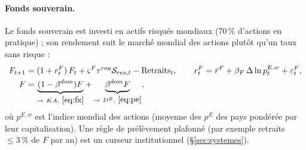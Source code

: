 \documentclass[11pt,a4paper]{article}
\begin{document}
\paragraph{Fonds souverain.} Le fonds souverain est investi en actifs risqués mondiaux (70\,\% d'actions en pratique) ; son rendement suit le marché mondial des actions plutôt qu'un taux sans risque :
\begin{equation}
\begin{split}
F_{t+1} &= (1+r^F_t)\,F_t + \varsigma^F\tau^{roy}\mathcal{S}_{res,t} - \text{Retraits}_t, \qquad
r^F_t = \bar r^F + \beta_F\,\Delta\ln p^{E,w}_t + \varepsilon^F_t,\\
F &= \underbrace{(1-\beta^{dom})F}_{\to\ KA,\ \eqref{eq:fx}} + \underbrace{\beta^{dom}F}_{\to\ D^E,\ \eqref{eq:pe}},
\end{split}
\label{eq:fonds}
\end{equation}
où $p^{E,w}$ est l'indice mondial des actions (moyenne des $p^E$ des pays pondérée par leur capitalisation). Une règle de prélèvement plafonné (par exemple retraits $\le 3\,\%$ de $F$ par an) est un curseur institutionnel (\S\ref{sec:systemes}).
\end{document}

